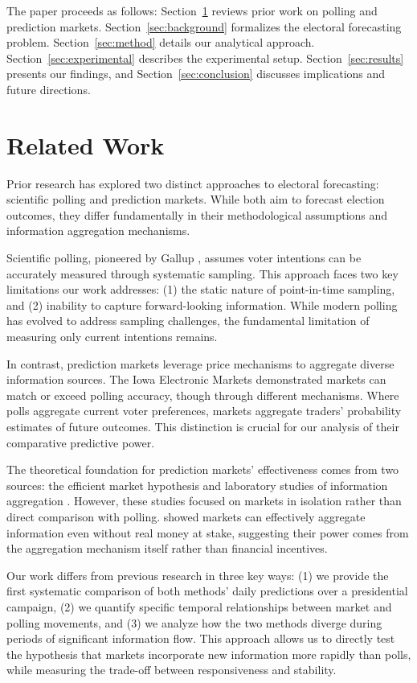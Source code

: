 \documentclass{article} %
\begin{document}
The paper proceeds as follows: Section~\ref{sec:related} reviews prior work on polling and prediction markets. Section~\ref{sec:background} formalizes the electoral forecasting problem. Section~\ref{sec:method} details our analytical approach. Section~\ref{sec:experimental} describes the experimental setup. Section~\ref{sec:results} presents our findings, and Section~\ref{sec:conclusion} discusses implications and future directions.

\section{Related Work}
\label{sec:related}
Prior research has explored two distinct approaches to electoral forecasting: scientific polling and prediction markets. While both aim to forecast election outcomes, they differ fundamentally in their methodological assumptions and information aggregation mechanisms.

Scientific polling, pioneered by Gallup \citep{Igo2006AGM}, assumes voter intentions can be accurately measured through systematic sampling. This approach faces two key limitations our work addresses: (1) the static nature of point-in-time sampling, and (2) inability to capture forward-looking information. While modern polling has evolved to address sampling challenges, the fundamental limitation of measuring only current intentions remains.

In contrast, prediction markets leverage price mechanisms to aggregate diverse information sources. The Iowa Electronic Markets \citep{Berg2005TheIE} demonstrated markets can match or exceed polling accuracy, though through different mechanisms. Where polls aggregate current voter preferences, markets aggregate traders' probability estimates of future outcomes. This distinction is crucial for our analysis of their comparative predictive power.

The theoretical foundation for prediction markets' effectiveness comes from two sources: the efficient market hypothesis \citep{Fama1970EFFICIENTCM} and laboratory studies of information aggregation \citep{Plott1988RationalEA}. However, these studies focused on markets in isolation rather than direct comparison with polling. \citet{Servan-Schreiber2004PredictionMD} showed markets can effectively aggregate information even without real money at stake, suggesting their power comes from the aggregation mechanism itself rather than financial incentives.

Our work differs from previous research in three key ways: (1) we provide the first systematic comparison of both methods' daily predictions over a presidential campaign, (2) we quantify specific temporal relationships between market and polling movements, and (3) we analyze how the two methods diverge during periods of significant information flow. This approach allows us to directly test the hypothesis that markets incorporate new information more rapidly than polls, while measuring the trade-off between responsiveness and stability.
\end{document}
